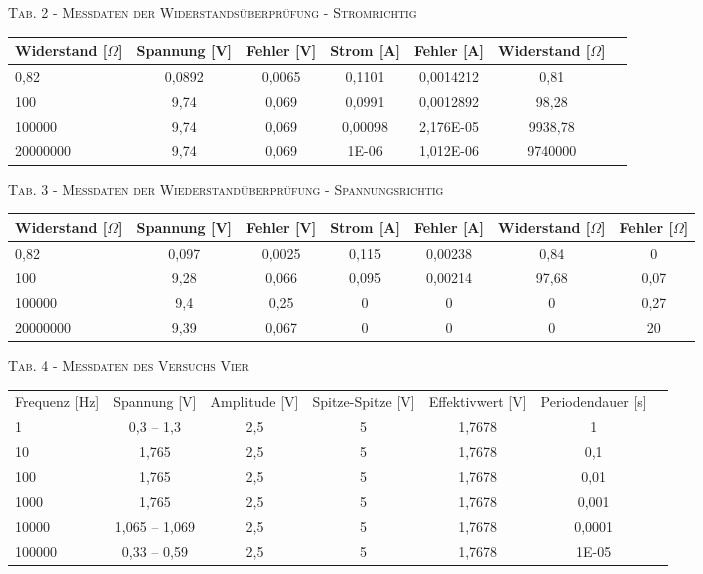 \documentclass[11pt]{article}
\begin{document}
\begin{center}
\textsc{Tab. 2 - Messdaten der Widerstandsüberprüfung - Stromrichtig}\\
\vspace{3mm}
\begin{tabular}{l|cc|cc|cc}
Widerstand [$\Omega$] & Spannung [V] & Fehler [V] & Strom [A] & Fehler [A] & Widerstand [$\Omega$] & \\
\hline
0,82 & 0,0892 & 0,0065 & 0,1101 & 0,0014212 & 0,81 & \\
100 & 9,74 & 0,069 & 0,0991 & 0,0012892 & 98,28 & \\
100000 & 9,74 & 0,069 & 0,00098 & 2,176E-05 & 9938,78 & \\
20000000 & 9,74 & 0,069 & 1E-06 & 1,012E-06 & 9740000 & \\
\end{tabular}
\vspace{5mm}

\textsc{Tab. 3 - Messdaten der Wiederstandüberprüfung - Spannungsrichtig}\\
\vspace{3mm}
\begin{tabular}{l|cc|cc|cc}
Widerstand [$\Omega$] & Spannung [V] & Fehler [V] & Strom [A] & Fehler [A] & Widerstand [$\Omega$] & Fehler [$\Omega$]\\
\hline
0,82 & 0,097 & 0,0025 & 0,115 & 0,00238 & 0,84 & 0\\
100 & 9,28 & 0,066 & 0,095 & 0,00214 & 97,68 & 0,07\\
100000 & 9,4 & 0,25 & 0 & 0 & 0 & 0,27\\
20000000 & 9,39 & 0,067 & 0 & 0 & 0 & 20\\
\end{tabular}
\vspace{5mm}

\textsc{Tab. 4 - Messdaten des Versuchs Vier}\\
\vspace{3mm}
\begin{tabular}{l|cccccc}
 Frequenz [Hz] & Spannung [V] & Amplitude [V] & Spitze-Spitze [V] & Effektivwert [V] & Periodendauer [s]\\
1 & 0,3 – 1,3 & 2,5 & 5 & 1,7678 & 1\\
10 & 1,765 & 2,5 & 5 & 1,7678 & 0,1\\
100 & 1,765 & 2,5 & 5 & 1,7678 & 0,01\\
1000 & 1,765 & 2,5 & 5 & 1,7678 & 0,001\\
10000 & 1,065 – 1,069 & 2,5 & 5 & 1,7678 & 0,0001\\
100000 & 0,33 – 0,59 & 2,5 & 5 & 1,7678 & 1E-05\\
\end{tabular}
\end{center}
\end{document}
